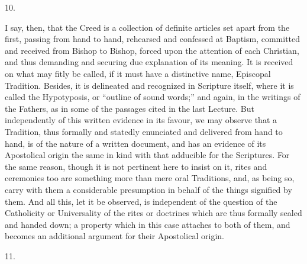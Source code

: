 10.

I say, then, that the Creed is a collection of definite articles
set apart from the first, passing from hand to hand, rehearsed and
confessed at Baptism, committed and received from Bishop to Bishop,
forced upon the attention of each Christian, and thus demanding and
securing due explanation of its meaning. It is received on what may
fitly be called, if it must have a distinctive name, Episcopal
Tradition. Besides, it is delineated and recognized in Scripture
itself, where it is called the Hypotyposis, or ``outline of sound
words;'' and again, in the writings of the Fathers, as in some of
the passages cited in the last Lecture. But independently of this
written evidence in its favour, we may observe that a Tradition, thus
formally and statedly enunciated and delivered from hand to hand, is
of the nature of a written document, and has an evidence of its
Apostolical origin the same in kind with that adducible for the
Scriptures. For the same reason, though it is not pertinent here to
insist on it, rites and ceremonies too are something more than mere
oral Traditions, and, as being so, carry with them a considerable
presumption in behalf of the things signified by them. And all this,
let it be observed, is independent of the question of the Catholicity
or Universality of the rites or doctrines which are thus formally
sealed and handed down; a property which in this case attaches to both
of them, and becomes an additional argument for their Apostolical
origin.

11.

